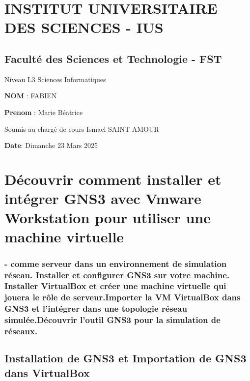 \documentclass[
]{article}
\author{}
\date{}
\begin{document}
\section{INSTITUT UNIVERSITAIRE DES SCIENCES -
IUS}\label{institut-universitaire-des-sciences---ius}

\subsection{\texorpdfstring{\textbf{Faculté des Sciences et Technologie
-
FST}}{Faculté des Sciences et Technologie - FST}}\label{facultuxe9-des-sciences-et-technologie---fst}

Niveau L3 Sciences Informatiques

\textbf{NOM} : FABIEN

\textbf{Prenom} : Marie Béatrice

Soumis au chargé de cours Ismael SAINT AMOUR

\textbf{Date}: Dimanche 23 Mars 2025

\section{Découvrir comment installer et intégrer GNS3 avec Vmware
Workstation pour utiliser une machine
virtuelle}\label{duxe9couvrir-comment-installer-et-intuxe9grer-gns3-avec-vmware-workstation-pour-utiliser-une-machine-virtuelle}

\subsubsection{- comme serveur dans un environnement de simulation
réseau. Installer et configurer GNS3 sur votre machine. Installer
VirtualBox et créer une machine virtuelle qui jouera le rôle de
serveur.Importer la VM VirtualBox dans GNS3 et l’intégrer dans une
topologie réseau simulée.Découvrir l’outil GNS3 pour la simulation de
réseaux.}\label{comme-serveur-dans-un-environnement-de-simulation-ruxe9seau.-installer-et-configurer-gns3-sur-votre-machine.-installer-virtualbox-et-cruxe9er-une-machine-virtuelle-qui-jouera-le-ruxf4le-de-serveur.importer-la-vm-virtualbox-dans-gns3-et-lintuxe9grer-dans-une-topologie-ruxe9seau-simuluxe9e.duxe9couvrir-loutil-gns3-pour-la-simulation-de-ruxe9seaux.}

\subsection{Installation de GNS3 et Importation de GNS3 dans
VirtualBox}\label{installation-de-gns3-et-importation-de-gns3-dans-virtualbox}
\end{document}
